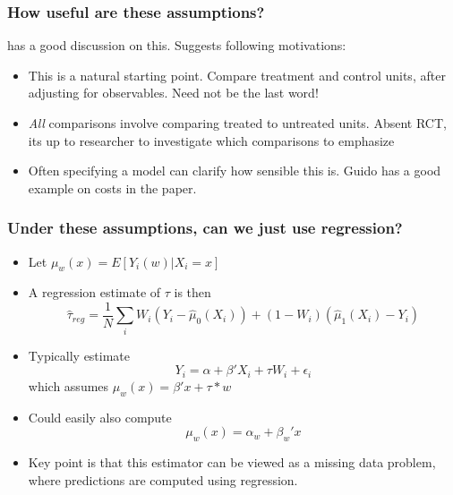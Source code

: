\begin{frame}
  \frametitle{How useful are these assumptions?}
  \citet{imbens2015matching} has a good discussion on this. Suggests following motivations: 
  \begin{itemize}
    \item This is a natural starting point. Compare treatment and control units, after adjusting for observables. Need not be the last word! 
    \item \textit{All} comparisons involve comparing treated to untreated units. Absent RCT, its up to researcher to investigate which comparisons to emphasize
    \item Often specifying a model can clarify how sensible this is. Guido has a good example on costs in the paper. 
  \end{itemize} 
\end{frame}

\begin{frame}
  \frametitle{Under these assumptions, can we just use regression?}
  \begin{itemize}
    \item Let $\mu_w(x) = E [Y_i(w) | X_i = x] $
    \item A regression estimate of $\tau$ is then 
     $$ \hat \tau_{reg} = \frac{1}{N} \sum_i W_i(Y_i - \hat \mu_0(X_i)) + (1-W_i)(\hat \mu_1(X_i) -  Y_i ) $$
    \item Typically estimate $$ Y_i = \alpha  + \beta'X_i + \tau W_i + \epsilon_i $$ which assumes $\mu_w(x) = \beta' x + \tau*w $ 
    \item Could easily also compute $$\mu_w(x) = \alpha_w + \beta_w'x$$
    \item Key point is that this estimator can be viewed as a \alert{missing data} problem, where predictions are computed using regression. 
  \end{itemize} 
\end{frame}

